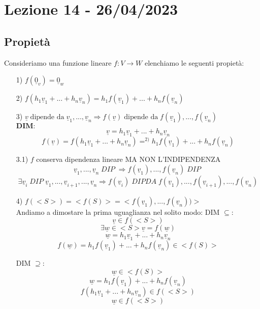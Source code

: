 \section{Lezione 14 - 26/04/2023}

\subsection{Propietà}
Consideriamo una funzione lineare $f: V \rightarrow W$ elenchiamo le seguenti propietà:

\begin{itemize}


\item[1)] $f(\underline{0}_v) = \underline{0}_w$


\item[2)] $f(h_1\underline{v}_1+...+h_n\underline{v}_n) = h_1f(\underline{v}_1)+...+h_nf(\underline{v}_n)$


\item[3)] $\underline{v} \; \text{dipende da} \; \underline{v}_1,...,\underline{v}_n \Rightarrow f(\underline{v}) \; \text{dipende da} \; f(\underline{v}_1),...,f(\underline{v}_n)$\\
$\textbf{DIM:}$
$$ \underline{v} = h_1\underline{v}_1+...+h_n\underline{v}_n $$
$$ f(\underline{v}) = f(h_1\underline{v}_1+...+h_n\underline{v}_n) =^{2)} h_1f(\underline{v}_1)+...+h_nf(\underline{v}_n)$$

\item[3.1)] $f$ conserva dipendenza lineare MA NON L'INDIPENDENZA
$$ \underline{v}_1,...,\underline{v}_n \;DIP\; \Rightarrow f(\underline{v}_1),...,f(\underline{v}_n) \;DIP\; $$
$$ \exists \underline{v}_i \;DIP\; \underline{v}_1,...,\underline{v}_{i+1},...,\underline{v}_n \Rightarrow f(\underline{v}_i) \;DIP DA\; f(\underline{v}_1),...,f(\underline{v}_{i+1}),...,f(\underline{v}_n)$$

\item[4)] $f(<S>) = <f(S)> = <f(\underline{v}_1),...,f(\underline{v}_n))>$\\

Andiamo a dimostare la prima uguaglianza nel solito modo:
\subitem DIM $\subseteq$:
$$ \underline{v} \in f(<S>) $$
$$ \exists \underline{w} \in <S> \underline{v} = f(\underline{w})$$
$$ \underline{w} = h_1\underline{v}_1+...+h_n\underline{v}_n$$
$$ f(\underline{w}) = h_1f(\underline{v}_1)+...+h_nf(\underline{v}_n) \in <f(S)>$$
 
\subitem DIM $\supseteq$:
$$ \underline{w} \in <f(S)> $$
$$ \underline{w} = h_1f(\underline{v}_1)+...+h_nf(\underline{v}_n)$$
$$ f(h_1\underline{v}_1+...+h_n\underline{v}_n) \in f(<S>)$$
$$ \underline{w} \in f(<S>) $$


\end{itemize}
